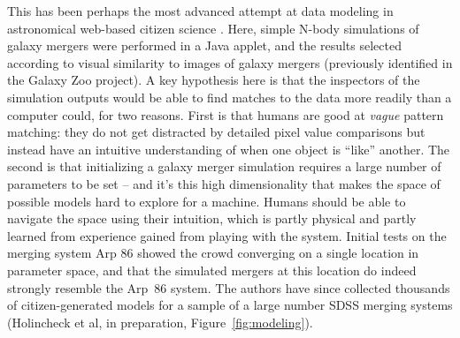 \documentclass{ar2e}
\def\Fref#1{Figure~\ref{#1}\xspace}
\def\CaseStudy#1{\noindent{\it\bf #1 \,\,\,\,}}
\begin{document}


\CaseStudy{Galaxy Zoo: Mergers} 
This has been perhaps the most advanced attempt at data modeling in 
astronomical web-based citizen science \citep{HolincheckEtal2010,WallinEtal2010}.
Here, simple N-body simulations of galaxy mergers were performed in a Java
applet, and the results selected according to visual similarity to images of
galaxy mergers (previously identified in the Galaxy Zoo project). A key
hypothesis here is that the inspectors of the simulation outputs would be able
to find matches to the data more readily than a computer could, for two reasons.
First is that humans are good at {\it vague} pattern matching: they do not get
distracted by detailed pixel value comparisons but instead have an intuitive
understanding of when one object is ``like'' another. The second is that
initializing a galaxy merger simulation requires a large number of parameters to
be set -- and it's this high dimensionality  that makes the space of possible
models hard to explore for a machine. Humans should be able to navigate the
space using their intuition, which is partly physical and partly learned from
experience gained from playing with the system. Initial tests on the merging
system Arp 86 showed
the crowd converging on a single location in parameter space, and that the
simulated mergers at this location do indeed strongly resemble the Arp~86
system. The authors have since collected thousands of citizen-generated models
for a sample of a large number SDSS merging systems (Holincheck et al, in
preparation, \Fref{fig:modeling}). 
\end{document}
